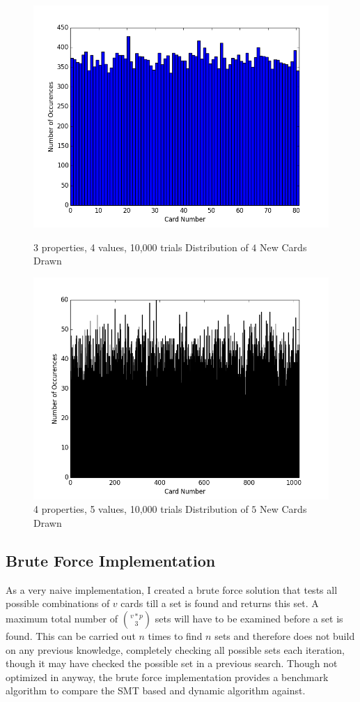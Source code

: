 \documentclass[pageno]{jpaper}
\begin{document}
\begin{figure}[htbb]
\begin{minipage}[b]{0.5\linewidth}
\centering
\includegraphics[width=.75\linewidth]{3p4v10000Draw.png}
\caption{3 properties, 4 values, 10,000 trials Distribution of $4$ New Cards Drawn}
\label{fig:draw1}
\end{minipage}
\hspace{0.5cm}
\begin{minipage}[b]{0.5\linewidth}
\centering
\includegraphics[width=.75\linewidth]{4p5v10000Draw.png}
\caption{4 properties, 5 values, 10,000 trials Distribution of $5$ New Cards Drawn}
\label{fig:draw2}
\end{minipage}
\end{figure}


\subsection{Brute Force Implementation}

As a very naive implementation, I created a brute force solution that tests all possible combinations of $v$ cards till a set is found and returns this set. A maximum total number of ${v*p}\choose{3}$ sets will have to be examined before a set is found. This can be carried out $n$ times to find $n$ sets and therefore does not build on any previous knowledge, completely checking all possible sets each iteration, though it may have checked the possible set in a previous search. Though not optimized in anyway, the brute force implementation provides a benchmark algorithm to compare the SMT based and dynamic algorithm against. 
\end{document}
